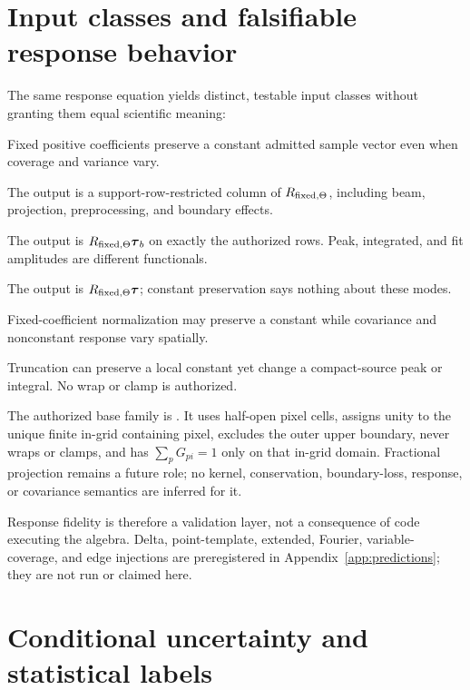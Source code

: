 \documentclass[10pt]{article}
\begin{document}
\clearpage
\section{Input classes and falsifiable response behavior}

The same response equation yields distinct, testable input classes without
granting them equal scientific meaning:

\begin{description}[style=nextline,leftmargin=1.8em]
\item[Constant.] Fixed positive coefficients preserve a constant admitted
sample vector even when coverage and variance vary.
\item[Delta or basis pixel.] The output is a support-row-restricted column of
\(R_{{\rm fixed},\Theta}\), including beam, projection, preprocessing, and boundary
effects.
\item[Point-source template.] The output is
\(R_{{\rm fixed},\Theta}\boldsymbol\tau_b\) on exactly the authorized rows. Peak,
integrated, and fit amplitudes are different functionals.
\item[Resolved, gradient, and Fourier structure.] The output is
\(R_{{\rm fixed},\Theta}\boldsymbol\tau\); constant preservation says nothing about these
modes.
\item[Variable coverage.] Fixed-coefficient normalization may preserve a
constant while covariance and nonconstant response vary spatially.
\item[Finite boundary.] Truncation can preserve a local constant yet change a
compact-source peak or integral. No wrap or clamp is authorized.
\end{description}

The authorized base family is
\SCIMapOneHotProfile. It uses half-open pixel cells,
assigns unity to the unique finite in-grid containing pixel, excludes the
outer upper boundary, never wraps or clamps, and has \(\sum_pG_{pi}=1\) only
on that in-grid domain. Fractional projection remains a future role; no
kernel, conservation, boundary-loss, response, or covariance semantics are
inferred for it.

Response fidelity is therefore a validation layer, not a consequence of code
executing the algebra. Delta, point-template, extended, Fourier, variable-
coverage, and edge injections are preregistered in Appendix~\ref{app:predictions};
they are not run or claimed here.

\clearpage
\section{Conditional uncertainty and statistical labels}
\end{document}
